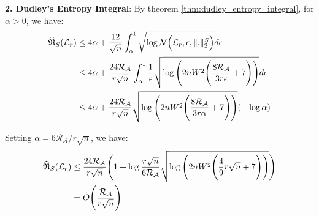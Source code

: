 \noindent\newline\textbf{2. Dudley's Entropy Integral}: By theorem \ref{thm:dudley_entropy_integral}, for $\alpha>0$, we have:
\begin{align*}
    \widehat{\mathfrak{R}}_S(\mathcal{L}_r) &\le 4\alpha + \frac{12}{\sqrt n}\int_\alpha^1 \sqrt{
        \log\mathcal{N}\Big( \mathcal{L}_r, \epsilon, \|.\|_2^S \Big)
    }d\epsilon \\
    &\le 4\alpha + \frac{24\mathcal{R_A}}{r\sqrt n}\int_{\alpha}^1\frac{1}{\epsilon}\sqrt{\log\Bigg( 
        2nW^2\Bigg( 
            \frac{8\mathcal{R_A}}{3r\epsilon} + 7
         \Bigg)
     \Bigg)}d\epsilon \\
    &\le 4\alpha + \frac{24\mathcal{R_A}}{r\sqrt n}\sqrt{
        \log\Bigg( 
            2nW^2\Bigg( 
                \frac{8\mathcal{R_A}}{3r\alpha} + 7
             \Bigg)
         \Bigg)
    }(-\log\alpha)
\end{align*}

\noindent Setting $\alpha=6\mathcal{R_A}/r\sqrt{n}$, we have:
\begin{align*}
    \widehat{\mathfrak{R}}_S(\mathcal{L}_r) &\le \frac{24\mathcal{R_A}}{r\sqrt n}\Bigg( 
        1 + \log\frac{r\sqrt{n}}{6\mathcal{R_A}}\sqrt{
            \log\Bigg( 
                2nW^2\Bigg( 
                    \frac{4}{9}r\sqrt{n} + 7
                 \Bigg)
             \Bigg)
        }
     \Bigg) \\
    &= \tilde O \Bigg( 
        \frac{\mathcal{R_A}}{r\sqrt n}
     \Bigg)
\end{align*}
